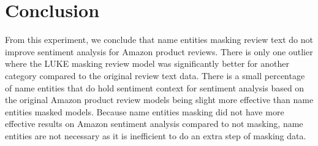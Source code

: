 \documentclass[11pt,a4paper]{article}
\begin{document}
\section{Conclusion}

From this experiment, we conclude that name entities masking review text do not improve sentiment analysis for Amazon product reviews. There is only one outlier where the LUKE masking review model was significantly better for another category compared to the original review text data. There is a small percentage of name entities that do hold sentiment context for sentiment analysis based on the original Amazon product review models being slight more effective than name entities masked models. Because name entities masking did not have more effective results on Amazon sentiment analysis compared to not masking, name entities are not necessary as it is inefficient to do an extra step of masking data.



\end{document}
